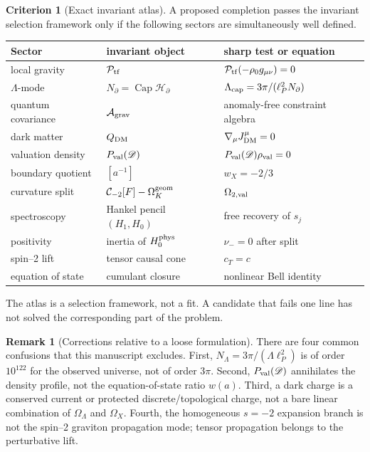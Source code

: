 \documentclass[aps,prd,reprint,nofootinbib,superscriptaddress,floatfix]{revtex4-2}
\numberwithin{equation}{section}
\theoremstyle{definition}
\newtheorem{criterion}{Criterion}[section]
\newtheorem{remark}{Remark}[section]
\theoremstyle{plain}
\newcommand{\Dil}{\mathscr D}
\newcommand{\Agrav}{\mathcal A_{\rm grav}}
\newcommand{\Ncap}{N_{\partial}}
\newcommand{\Capacity}{\operatorname{Cap}}
\newcommand{\Ptr}{\mathcal P_{\rm tf}}
\begin{document}
\begin{criterion}[Exact invariant atlas]\label{crit:atlas}
A proposed completion passes the invariant selection framework only if the following sectors are simultaneously well defined.
\begin{center}
\footnotesize
\setlength{\tabcolsep}{2pt}
\begin{tabular}{@{}p{}p{}p{}@{}}
\toprule
Sector & invariant object & sharp test or equation\\
\midrule
local gravity & \(\Ptr\) & \(\Ptr(-\rho_0g_{\mu\nu})=0\)\\
\(\Lambda\)-mode & \(\Ncap=\Capacity\mathcal H_\partial\) & \(\Lambda_{\rm cap}=3\pi/(\ell_P^2\Ncap)\)\\
quantum covariance & \(\Agrav\) & anomaly-free constraint algebra\\
dark matter & \(Q_{\rm DM}\) & \(\nabla_\mu J^\mu_{\rm DM}=0\)\\
valuation density & \(P_{\rm val}(\Dil)\) & \(P_{\rm val}(\Dil)\rho_{\rm val}=0\)\\
boundary quotient & \([a^{-1}]\) & \(w_X=-2/3\)\\
curvature split & \(\mathcal C_{-2}[F]-\Omega_K^{\rm geom}\) & \(\Omega_{2,\rm val}\)\\
spectroscopy & Hankel pencil \((H_1,H_0)\) & free recovery of \(s_j\)\\
positivity & inertia of \(H_0^{\rm phys}\) & \(\nu_-=0\) after split\\
spin--2 lift & tensor causal cone & \(c_T=c\)\\
equation of state & cumulant closure & nonlinear Bell identity\\
\bottomrule
\end{tabular}
\end{center}
The atlas is a selection framework, not a fit.  A candidate that fails one line has not solved the corresponding part of the problem.
\end{criterion}

\begin{remark}[Corrections relative to a loose formulation]
There are four common confusions that this manuscript excludes.  First, \(N_\Lambda=3\pi/(\Lambda\ell_P^2)\) is of order \(10^{122}\) for the observed universe, not of order \(3\pi\).  Second, \(P_{\rm val}(\Dil)\) annihilates the density profile, not the equation-of-state ratio \(w(a)\).  Third, a dark charge is a conserved current or protected discrete/topological charge, not a bare linear combination of \(\Omega_\Lambda\) and \(\Omega_X\).  Fourth, the homogeneous \(s=-2\) expansion branch is not the spin--2 graviton propagation mode; tensor propagation belongs to the perturbative lift.
\end{remark}
\end{document}

